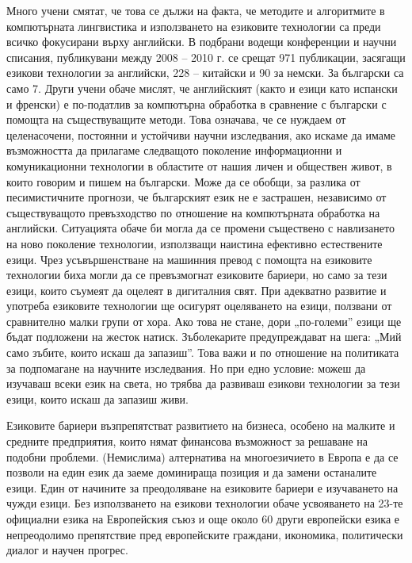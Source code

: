 \begin{multicols}{2}
Много учени смятат, че това се дължи на факта, че методите и алгоритмите в компютърната лингвистика и използването на езиковите технологии са преди всичко фокусирани върху английски. В подбрани водещи конференции и научни списания, публикувани между 2008 – 2010 г. се срещат 971 публикации, засягащи езикови технологии за английски, 228 – китайски и 90 за немски. За български са само 7. Други учени обаче мислят, че английският (както и езици като испански и френски) е по-податлив за компютърна обработка в сравнение с български с помощта на съществуващите методи.  Това означава, че се нуждаем от целенасочени, постоянни и устойчиви научни изследвания, ако искаме да имаме възможността да прилагаме следващото поколение информационни и комуникационни технологии в областите от нашия личен и обществен живот, в които говорим и пишем на български.  Може да се обобщи, за разлика от песимистичните прогнози, че българският език не е застрашен, независимо от съществуващото превъзходство по отношение на компютърната обработка на английски. Ситуацията обаче би могла да се промени съществено с навлизането на ново поколение технологии, използващи наистина ефективно естествените езици. Чрез усъвършенстване на машинния превод с помощта на езиковите технологии биха могли да се превъзмогнат езиковите бариери, но само за тези езици, които съумеят да оцелеят в дигиталния свят. При адекватно развитие и употреба езиковите технологии ще осигурят оцеляването на езици, ползвани от сравнително малки групи от хора. Ако това не стане, дори „по-големи” езици ще бъдат подложени на жесток натиск.  Зъболекарите предупреждават на шега: „Мий само зъбите, които искаш да запазиш”. Това важи и по отношение на политиката за подпомагане на научните изследвания. Но при едно условие: можеш да изучаваш всеки език на света, но трябва да развиваш езикови технологии за тези езици, които искаш да запазиш живи.


Езиковите бариери възпрепятстват развитието на бизнеса, особено на малките и средните предприятия, които нямат финансова възможност за решаване на подобни проблеми. (Немислима) алтернатива на многоезичието в Европа е да се позволи на един език да заеме доминираща позиция и да замени останалите езици. Един от начините за преодоляване на езиковите бариери е изучаването на чужди езици. Без използването на езикови технологии обаче усвояването на 23-те официални езика на Европейския съюз и още около 60 други европейски езика е непреодолимо препятствие пред европейските граждани, икономика, политически диалог и научен прогрес.


\end{multicols}
